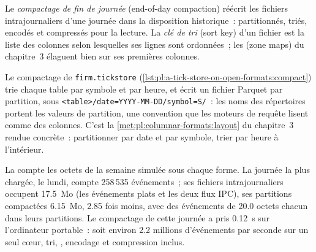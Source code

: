 \begin{definition}\label{def:pl:a-tick-store-on-open-formats:compaction}
Le \emph{compactage de fin de journée} (end-of-day compaction) réécrit les fichiers intrajournaliers d'une journée dans la disposition historique~: partitionnés,
triés, encodés et compressés pour la lecture. La \emph{clé de tri} (sort key) d'un fichier est la liste des colonnes selon lesquelles ses lignes sont
ordonnées~; les  (zone maps) du chapitre~3 élaguent bien sur ses premières colonnes.
\end{definition}

Le compactage de \texttt{firm.tickstore} (\cref{lst:pl:a-tick-store-on-open-formats:compact}) trie chaque table par symbole et
par heure, et écrit un fichier Parquet par partition, sous \texttt{<table>/date=YYYY-MM-DD/symbol=S/}~: les noms des répertoires portent
les valeurs de partition, une convention que les moteurs de requête lisent comme des colonnes. C'est la \cref{met:pl:columnar-formats:layout} du
chapitre~3 rendue concrète~: partitionner par date et par symbole, trier par heure à l'intérieur.

\label{lst:pl:a-tick-store-on-open-formats:compact}

La  compte les octets de la semaine simulée sous chaque forme. La journée la plus chargée, le lundi,
compte 258\,535 événements~; ses fichiers intrajournaliers occupent 17.5~Mo (les événements plats et les deux flux IPC), ses partitions compactées 6.15~Mo,
2.85 fois moins, avec des événements de 20.0 octets chacun dans leurs partitions. Le compactage de cette journée a pris 0.12~s sur l'ordinateur portable~:
soit environ 2.2 millions d'événements par seconde sur un seul cœur, tri, , encodage et compression inclus.

